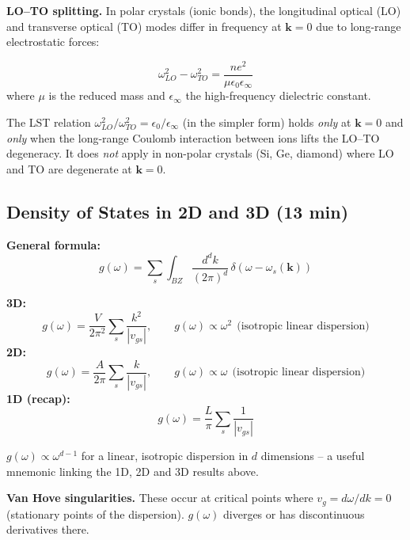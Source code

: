 \documentclass[11pt,a4paper]{article}
\begin{document}
\textbf{LO--TO splitting.} In polar crystals (ionic bonds), the longitudinal optical
(LO) and transverse optical (TO) modes differ in frequency at $\mathbf k=0$ due to
long-range electrostatic forces:
\begin{keybox}
\[
\omega_{LO}^2-\omega_{TO}^2 = \frac{ne^2}{\mu\epsilon_0\epsilon_\infty}
\]
where $\mu$ is the reduced mass and $\epsilon_\infty$ the high-frequency dielectric
constant.
\end{keybox}

\begin{pitbox}[Lyddane--Sachs--Teller is only at $\mathbf k=0$ and only for polar crystals]
The LST relation $\omega_{LO}^2/\omega_{TO}^2 = \epsilon_0/\epsilon_\infty$ (in the
simpler form) holds \emph{only} at $\mathbf k=0$ and \emph{only} when the
long-range Coulomb interaction between ions lifts the LO--TO degeneracy. It does
\emph{not} apply in non-polar crystals (Si, Ge, diamond) where LO and TO are
degenerate at $\mathbf k=0$.
\end{pitbox}

\subsection{Density of States in 2D and 3D \hfill \small(13 min)}

\textbf{General formula:}
\[
g(\omega) = \sum_s\int_{BZ}\frac{d^dk}{(2\pi)^d}\,\delta\!\left(\omega-\omega_s(\mathbf k)\right)
\]

\textbf{3D:}
\[
g(\omega) = \frac{V}{2\pi^2}\sum_s\frac{k^2}{|v_{gs}|}, \qquad
g(\omega)\propto\omega^2 \ \ \text{(isotropic linear dispersion)}
\]
\textbf{2D:}
\[
g(\omega) = \frac{A}{2\pi}\sum_s\frac{k}{|v_{gs}|}, \qquad
g(\omega)\propto\omega \ \ \text{(isotropic linear dispersion)}
\]
\textbf{1D (recap):}
\[
g(\omega) = \frac{L}{\pi}\sum_s\frac{1}{|v_{gs}|}
\]

\begin{keybox}
$g(\omega)\propto\omega^{d-1}$ for a linear, isotropic dispersion in $d$ dimensions
-- a useful mnemonic linking the 1D, 2D and 3D results above.
\end{keybox}

\textbf{Van Hove singularities.} These occur at critical points where
$v_g=d\omega/dk=0$ (stationary points of the dispersion). $g(\omega)$ diverges or has
discontinuous derivatives there.
\end{document}
